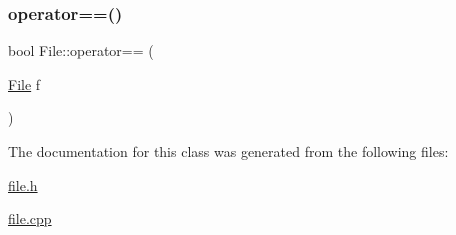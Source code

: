 \subsubsection{\texorpdfstring{operator==()}{operator==()}}
{\footnotesize\ttfamily bool File\+::operator== (\begin{DoxyParamCaption}\item[{\hyperlink{class_file}{File}}]{f }\end{DoxyParamCaption})\hspace{0.3cm}{\ttfamily [inline]}}



The documentation for this class was generated from the following files\+:\begin{DoxyCompactItemize}
\item 
\hyperlink{file_8h}{file.\+h}\item 
\hyperlink{file_8cpp}{file.\+cpp}\end{DoxyCompactItemize}

